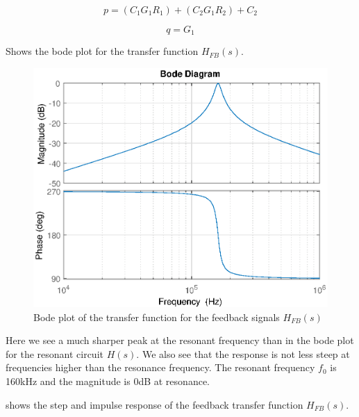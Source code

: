 \begin{equation} \label{eq:fb_p}
    p = (C_1 G_1 R_1) + (C_2 G_1 R_2) + C_2
\end{equation}

\begin{equation} \label{eq:fb_q}
    q = G_1
\end{equation}

 Shows the bode plot for the transfer function $H_{FB}(s)$.

\begin{figure}[H]
    \centering
    \includegraphics[width=\textwidth]{img/FeedBackBode.eps}
    \caption{Bode plot of the transfer function for the feedback signals $H_{FB}(s)$}
    \label{fig:fb_bode}
\end{figure}

Here we see a much sharper peak at the resonant frequency than in the bode plot for the resonant circuit $H(s)$. We also see that the response is not less steep at frequencies higher than the resonance frequency. The resonant frequency $f_0$ is 160kHz and the magnitude is 0dB at resonance.


 shows the step and impulse response of the feedback transfer function $H_{FB}(s)$.


